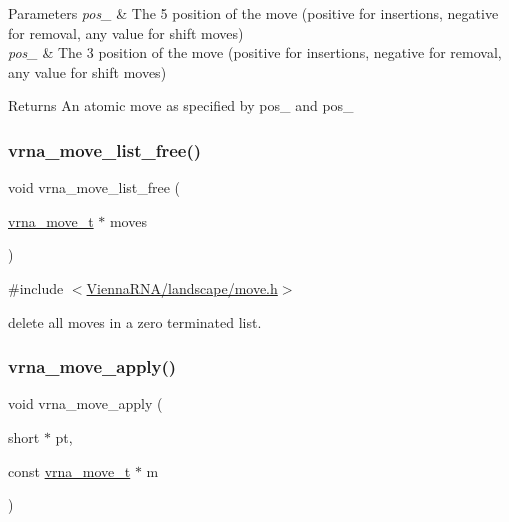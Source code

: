 \begin{DoxyParams}{Parameters}
{\em pos\+\_} & The 5\textquotesingle{} position of the move (positive for insertions, negative for removal, any value for shift moves) \\
\hline
{\em pos\+\_} & The 3\textquotesingle{} position of the move (positive for insertions, negative for removal, any value for shift moves) \\
\hline
\end{DoxyParams}
\begin{DoxyReturn}{Returns}
An atomic move as specified by {\ttfamily pos\+\_} and {\ttfamily pos\+\_} 
\end{DoxyReturn}
\mbox{\label{group__neighbors_gad085062ae3aa7ee20783debe4a906fad}} 
\subsubsection{\texorpdfstring{vrna\_move\_list\_free()}{vrna\_move\_list\_free()}}
{\footnotesize\ttfamily void vrna\+\_\+move\+\_\+list\+\_\+free (\begin{DoxyParamCaption}\item[{\mbox{\hyperlink{group__neighbors_ga08630e00206cd163ea29c462bf5f4755}{vrna\+\_\+move\+\_\+t}} $\ast$}]{moves }\end{DoxyParamCaption})}



{\ttfamily \#include $<$\mbox{\hyperlink{move_8h}{Vienna\+R\+N\+A/landscape/move.\+h}}$>$}

delete all moves in a zero terminated list. \mbox{\label{group__neighbors_gacdbc5f609b46aeb07d2c7e015677a1e0}} 
\subsubsection{\texorpdfstring{vrna\_move\_apply()}{vrna\_move\_apply()}}
{\footnotesize\ttfamily void vrna\+\_\+move\+\_\+apply (\begin{DoxyParamCaption}\item[{short $\ast$}]{pt,  }\item[{const \mbox{\hyperlink{group__neighbors_ga08630e00206cd163ea29c462bf5f4755}{vrna\+\_\+move\+\_\+t}} $\ast$}]{m }\end{DoxyParamCaption})}




